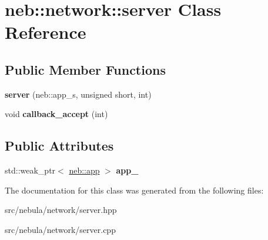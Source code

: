 \hypertarget{classneb_1_1network_1_1server}{
\section{neb::network::server Class Reference}
\label{classneb_1_1network_1_1server}
}
\subsection*{Public Member Functions}
\begin{DoxyCompactItemize}
\item 
\hypertarget{classneb_1_1network_1_1server_a55eb2c80a90c0b5b6d858373b8162ec4}{
{\bfseries server} (neb::app\_\-s, unsigned short, int)}
\label{classneb_1_1network_1_1server_a55eb2c80a90c0b5b6d858373b8162ec4}

\item 
\hypertarget{classneb_1_1network_1_1server_a3abc21bea913d905137668449665e7c4}{
void {\bfseries callback\_\-accept} (int)}
\label{classneb_1_1network_1_1server_a3abc21bea913d905137668449665e7c4}

\end{DoxyCompactItemize}
\subsection*{Public Attributes}
\begin{DoxyCompactItemize}
\item 
\hypertarget{classneb_1_1network_1_1server_a878fe2bc88c7e06dcd6b88d6dc0a5983}{
std::weak\_\-ptr$<$ \hyperlink{classneb_1_1app}{neb::app} $>$ {\bfseries app\_\-}}
\label{classneb_1_1network_1_1server_a878fe2bc88c7e06dcd6b88d6dc0a5983}

\end{DoxyCompactItemize}


The documentation for this class was generated from the following files:\begin{DoxyCompactItemize}
\item 
src/nebula/network/server.hpp\item 
src/nebula/network/server.cpp\end{DoxyCompactItemize}
